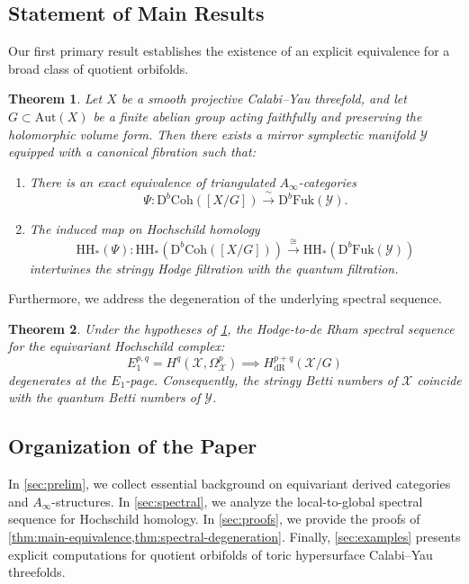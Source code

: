 \documentclass[12pt,reqno]{amsart}
\theoremstyle{plain}
\newtheorem{theorem}{Theorem}[section]
\theoremstyle{definition}
\theoremstyle{remark}
\newcommand{\cX}{\mathcal{X}}
\newcommand{\cY}{\mathcal{Y}}
\newcommand{\Db}{\mathrm{D}^b}
\newcommand{\Coh}{\mathrm{Coh}}
\newcommand{\Fuk}{\mathrm{Fuk}}
\newcommand{\HH}{\mathrm{HH}}
\numberwithin{equation}{section}
\begin{document}
\subsection{Statement of Main Results}
Our first primary result establishes the existence of an explicit equivalence for a broad class of quotient orbifolds.

\begin{theorem}
\label{thm:main-equivalence}
Let $X$ be a smooth projective Calabi--Yau threefold, and let $G \subset \mathrm{Aut}(X)$ be a finite abelian group acting faithfully and preserving the holomorphic volume form. Then there exists a mirror symplectic manifold $\cY$ equipped with a canonical fibration such that:
\begin{enumerate}
\item[(i)] There is an exact equivalence of triangulated $A_\infty$-categories
\begin{equation*}
\Psi \colon \Db\Coh([X/G]) \xrightarrow{\;\sim\;} \Db\Fuk(\cY).
\end{equation*}
\item[(ii)] The induced map on Hochschild homology
\begin{equation*}
\HH_*(\Psi) \colon \HH_*(\Db\Coh([X/G])) \xrightarrow{\;\cong\;} \HH_*(\Db\Fuk(\cY))
\end{equation*}
intertwines the stringy Hodge filtration with the quantum filtration.
\end{enumerate}
\end{theorem}

Furthermore, we address the degeneration of the underlying spectral sequence.

\begin{theorem}
\label{thm:spectral-degeneration}
Under the hypotheses of \cref{thm:main-equivalence}, the Hodge-to-de Rham spectral sequence for the equivariant Hochschild complex:
\begin{equation}
\label{eq:spectral-sequence}
E_1^{p,q} = H^q(\cX, \Omega_\cX^p) \implies H^{p+q}_{\mathrm{dR}}(\cX/G)
\end{equation}
degenerates at the $E_1$-page. Consequently, the stringy Betti numbers of $\cX$ coincide with the quantum Betti numbers of $\cY$.
\end{theorem}

\subsection{Organization of the Paper}
In \cref{sec:prelim}, we collect essential background on equivariant derived categories and $A_\infty$-structures. In \cref{sec:spectral}, we analyze the local-to-global spectral sequence for Hochschild homology. In \cref{sec:proofs}, we provide the proofs of \cref{thm:main-equivalence,thm:spectral-degeneration}. Finally, \cref{sec:examples} presents explicit computations for quotient orbifolds of toric hypersurface Calabi--Yau threefolds.
\end{document}

